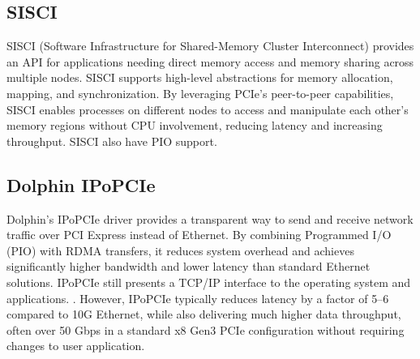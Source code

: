\subsection{SISCI}
SISCI (Software Infrastructure for Shared-Memory Cluster Interconnect) provides an API for applications needing direct memory access and memory sharing across multiple nodes. SISCI supports high-level abstractions for memory allocation, mapping, and synchronization. By leveraging PCIe’s peer-to-peer capabilities, SISCI enables processes on different nodes to access and manipulate each other's memory regions without CPU involvement, reducing latency and increasing throughput. SISCI also have PIO support.

\subsection{Dolphin IPoPCIe}
Dolphin’s IPoPCIe driver provides a transparent way to send and receive network traffic over PCI Express instead of Ethernet. By combining Programmed I/O (PIO) with RDMA transfers, it reduces system overhead and achieves significantly higher bandwidth and lower latency than standard Ethernet solutions. IPoPCIe still presents a TCP/IP interface to the operating system and applications. . However, IPoPCIe typically reduces latency by a factor of 5–6 compared to 10G Ethernet, while also delivering much higher data throughput, often over 50 Gbps in a standard x8 Gen3 PCIe configuration without requiring changes to user application. \cite{dolphin_fast_tcp_udp_ip}